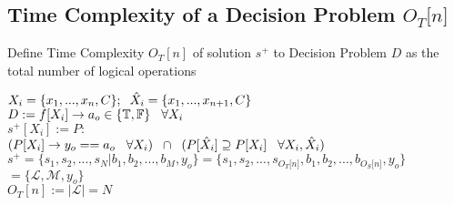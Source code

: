 \documentclass[11pt]{article}
\begin{document}
\subsection{Time Complexity of a Decision Problem $O_T \lbrack n \rbrack$}
Define Time Complexity $O_T [n]$ of solution $s^+$ to Decision Problem $D$ as the total number of logical operations
\begin{center}
\vspace{1mm}
$
X_i = \{x_1,...,x_n,C\}; \hspace{2mm} \hat{X}_i = \{x_1,...,x_{n+1},C\}
$
\\ \vspace{4mm}
$
D := f \lbrack X_i \rbrack \rightarrow a_{o} \in \{\mathbb{T}, \mathbb{F}\} \hspace{3mm} \forall X_i
$
\\ \vspace{4mm}
$
s^+[X_i] := P :
$
\\ \vspace{2mm}
$
(P \lbrack X_i \rbrack \rightarrow y_{o} == a_{o} \hspace{3mm} \forall X_i) \hspace{2mm} \cap \hspace{2mm} (P[\hat{X}_i] \supseteq P[X_i] \hspace{3mm} \forall X_i,\hat{X}_i)
$
\\ \vspace{4mm}
$
s^+ = \{ s_1,s_2,...,s_N|b_1,b_2,...,b_M,y_o\} = \{ s_1,s_2,...,s_{O_T \lbrack n \rbrack }, b_1, b_2,...,b_{O_S \lbrack n \rbrack},y_o \}
$
\\ \vspace{2mm}
$
= \{ \mathcal{L},\mathcal{M},y_o\}
$
\\ \vspace{3mm}
$
O_T[n] := |\mathcal{L}| = N
$
\end{center}
\end{document}
